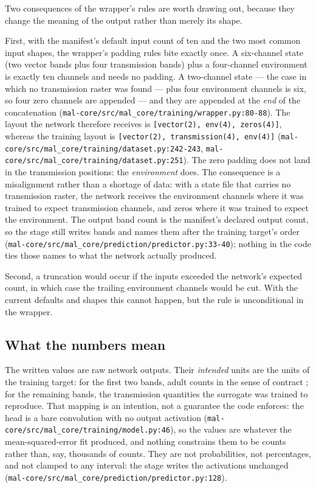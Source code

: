 \documentclass[11pt,a4paper]{article}
\newcommand{\code}[1]{\texttt{#1}}
\begin{document}
Two consequences of the wrapper's rules are worth drawing out, because they
change the meaning of the output rather than merely its shape.

First, with the manifest's default input count of ten and the two most
common input shapes, the wrapper's padding rules bite exactly once. A
six-channel state (two vector bands plus four transmission bands) plus a
four-channel environment is exactly ten channels and needs no padding. A
two-channel state --- the case in which no transmission raster was found ---
plus four environment channels is six, so four zero channels are appended ---
and they are appended at the \emph{end} of the concatenation
(\code{mal-core/src/mal\_core/training/wrapper.py:80-88}). The layout the
network therefore receives is \code{[vector(2), env(4), zeros(4)]}, whereas
the training layout is
\code{[vector(2), transmission(4), env(4)]}
(\code{mal-core/src/mal\_core/training/dataset.py:242-243},
\code{mal-core/src/mal\_core/training/dataset.py:251}). The zero padding
does not land in the transmission positions: the \emph{environment} does. The
consequence is a misalignment rather than a shortage of data: with a state
file that carries no transmission raster, the network receives the environment
channels where it was trained to expect transmission channels, and zeros where
it was trained to expect the environment. The output band count is the
manifest's declared output count, so the stage still writes
 bands and
names them after the training target's order
(\code{mal-core/src/mal\_core/prediction/predictor.py:33-40}); nothing in the
code ties those names to what the network actually produced.

Second, a truncation would occur if the inputs exceeded the network's expected
count, in which case the trailing environment channels would be cut. With the
current defaults and shapes this cannot happen, but the rule is unconditional
in the wrapper.

\subsection{What the numbers mean}

The written values are raw network outputs. Their \emph{intended} units are the
units of the training target: for the first two bands, adult counts in the
sense of contract ; for the remaining bands, the
transmission quantities the surrogate was trained to reproduce. That mapping is
an intention, not a guarantee the code enforces: the head is a bare
convolution with no output activation
(\code{mal-core/src/mal\_core/training/model.py:46}), so the values are
whatever the mean-squared-error fit produced, and nothing constrains them to
be counts rather than, say, thousands of counts. They are not probabilities,
not percentages, and not clamped to any interval: the stage writes the
activations unchanged
(\code{mal-core/src/mal\_core/prediction/predictor.py:128}).
\end{document}
